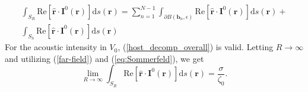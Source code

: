 \documentclass{article}
\begin{document}
%
\begin{align}
\nonumber
\int_{S_R}\mathrm{Re}\left[\hat{\mathbf{r}}\cdot\mathbf{I}^0(\mathbf{r})\right]\mathrm{d}s(\mathbf{r})=\sum_{n=1}^{N-1}\int_{\partial B(\mathbf{b}_n,\epsilon)}\mathrm{Re}\left[\hat{\mathbf{r}}\cdot\mathbf{I}^0(\mathbf{r})\right]\mathrm{d}s(\mathbf{r})+\\\int_{S_h}\mathrm{Re}\left[\hat{\mathbf{r}}\cdot\mathbf{I}^0(\mathbf{r})\right]\mathrm{d}s(\mathbf{r})\label{theorem7_1}
\end{align}
%
For the acoustic intensity in $V_0$, (\ref{host_decomp_overall}) is valid. Letting $R\rightarrow\infty$ and utilizing (\ref{far-field}) and (\ref{eq:Sommerfeld}), we get
%
\begin{equation}
\label{theorem7_2}
\lim_{R\rightarrow\infty}\int_{S_R}\mathrm{Re}\left[\hat{\mathbf{r}}\cdot\mathbf{I}^0(\mathbf{r})\right]\mathrm{d}s(\mathbf{r})=\frac{\sigma}{\zeta_0}.
\end{equation}
%
\end{document}

